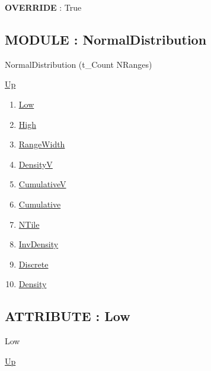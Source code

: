 \par
\par
\textbf{OVERRIDE} : True \\

\subsection*{MODULE : NormalDistribution}
\hypertarget{ecldoc:linearregression.ols.normaldistribution}{}
\begin{minipage}[t]{\textwidth}
\begin{flushleft}
 NormalDistribution (t\_Count NRanges)
\end{flushleft}
\end{minipage}
\hyperlink{ecldoc:linearregression.ols}{Up}

\par
\par
\begin{enumerate}
\item \hyperlink{ecldoc:linearregression.ols.distributionbase.low}{Low}
\item \hyperlink{ecldoc:linearregression.ols.distributionbase.high}{High}
\item \hyperlink{ecldoc:linearregression.ols.distributionbase.rangewidth}{RangeWidth}
\item \hyperlink{ecldoc:linearregression.ols.distributionbase.densityv}{DensityV}
\item \hyperlink{ecldoc:linearregression.ols.distributionbase.cumulativev}{CumulativeV}
\item \hyperlink{ecldoc:linearregression.ols.distributionbase.cumulative}{Cumulative}
\item \hyperlink{ecldoc:linearregression.ols.distributionbase.ntile}{NTile}
\item \hyperlink{ecldoc:linearregression.ols.distributionbase.invdensity}{InvDensity}
\item \hyperlink{ecldoc:linearregression.ols.distributionbase.discrete}{Discrete}
\item \hyperlink{ecldoc:linearregression.ols.normaldistribution.density}{Density}
\end{enumerate}
\subsection*{ATTRIBUTE : Low}
\hypertarget{ecldoc:linearregression.ols.distributionbase.low}{}
\begin{minipage}[t]{\textwidth}
\begin{flushleft}
 Low 
\end{flushleft}
\end{minipage}
\hyperlink{ecldoc:linearregression.ols.normaldistribution}{Up}

